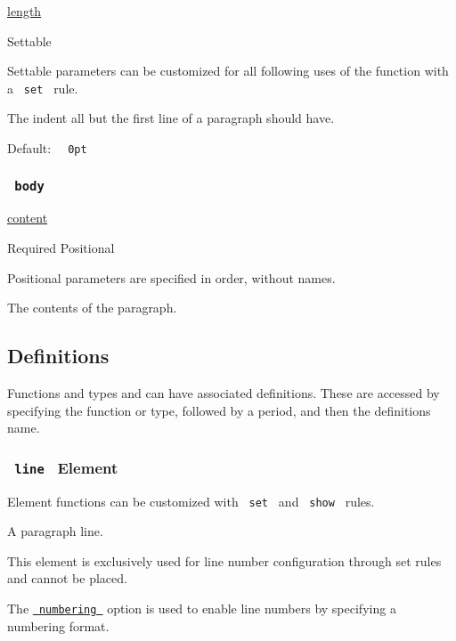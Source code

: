 \href{/docs/reference/layout/length/}{length}

{{ Settable }}

\label{parameters-hanging-indent-settable-tooltip}
Settable parameters can be customized for all following uses of the
function with a \texttt{\ set\ } rule.

The indent all but the first line of a paragraph should have.

Default: \texttt{\ }{\texttt{\ 0pt\ }}\texttt{\ }

\subsubsection{\texorpdfstring{\texttt{\ body\ }}{ body }}\label{parameters-body}

\href{/docs/reference/foundations/content/}{content}

{Required} {{ Positional }}

\label{parameters-body-positional-tooltip}
Positional parameters are specified in order, without names.

The contents of the paragraph.

\subsection{\texorpdfstring{{ Definitions
}}{ Definitions }}\label{definitions}

\label{definitions-tooltip}
Functions and types and can have associated definitions. These are
accessed by specifying the function or type, followed by a period, and
then the definition\textquotesingle s name.

\subsubsection{\texorpdfstring{\texttt{\ line\ } {{ Element
}}}{ line   Element }}\label{definitions-line}

\label{definitions-line-element-tooltip}
Element functions can be customized with \texttt{\ set\ } and
\texttt{\ show\ } rules.

A paragraph line.

This element is exclusively used for line number configuration through
set rules and cannot be placed.

The
\href{/docs/reference/model/par/\#definitions-line-numbering}{\texttt{\ numbering\ }}
option is used to enable line numbers by specifying a numbering format.

